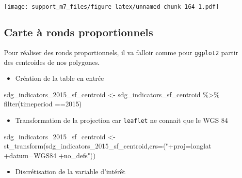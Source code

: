 \documentclass[
]{book}
\newenvironment{Shaded}{\begin{snugshade}}{\end{snugshade}}
\newcommand{\AttributeTok}[1]{\textcolor[rgb]{0.77,0.63,0.00}{#1}}
\newcommand{\DecValTok}[1]{\textcolor[rgb]{0.00,0.00,0.81}{#1}}
\newcommand{\FunctionTok}[1]{\textcolor[rgb]{0.00,0.00,0.00}{#1}}
\newcommand{\NormalTok}[1]{#1}
\newcommand{\OtherTok}[1]{\textcolor[rgb]{0.56,0.35,0.01}{#1}}
\newcommand{\SpecialCharTok}[1]{\textcolor[rgb]{0.00,0.00,0.00}{#1}}
\newcommand{\StringTok}[1]{\textcolor[rgb]{0.31,0.60,0.02}{#1}}
\providecommand{\tightlist}{%
  \setlength{\itemsep}{0pt}\setlength{\parskip}{0pt}}
\begin{document}
\texttt{[image: support\_m7\_files/figure-latex/unnamed-chunk-164-1.pdf]}

\hypertarget{carte-uxe0-ronds-proportionnels}{%
\subsection{Carte à ronds proportionnels}\label{carte-uxe0-ronds-proportionnels}}

Pour réaliser des ronds proportionnels, il va falloir comme pour \texttt{ggplot2} partir des centroides de nos polygones.

\begin{itemize}
\tightlist
\item
  Création de la table en entrée
\end{itemize}

\begin{Shaded}
\begin{Highlighting}[]
\NormalTok{sdg\_indicators\_2015\_sf\_centroid }\OtherTok{\textless{}{-}}\NormalTok{ sdg\_indicators\_sf\_centroid }\SpecialCharTok{\%\textgreater{}\%} 
  \FunctionTok{filter}\NormalTok{(timeperiod }\SpecialCharTok{==}\DecValTok{2015}\NormalTok{)}
\end{Highlighting}
\end{Shaded}

\begin{itemize}
\tightlist
\item
  Transformation de la projection car \texttt{leaflet} ne connait que le WGS 84
\end{itemize}

\begin{Shaded}
\begin{Highlighting}[]
\NormalTok{sdg\_indicators\_2015\_sf\_centroid }\OtherTok{\textless{}{-}} \FunctionTok{st\_transform}\NormalTok{(sdg\_indicators\_2015\_sf\_centroid,}\AttributeTok{crs=}\NormalTok{(}\StringTok{"+proj=longlat +datum=WGS84 +no\_defs"}\NormalTok{))}
\end{Highlighting}
\end{Shaded}

\begin{itemize}
\tightlist
\item
  Discrétisation de la variable d'intérêt
\end{itemize}

\begin{Shaded}
\end{Shaded}
\end{document}
